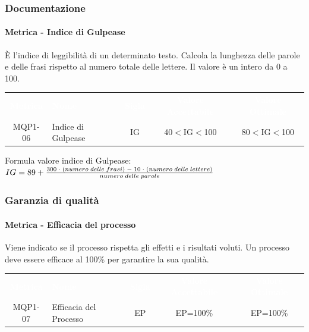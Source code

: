     \subsubsection{Documentazione}
        \paragraph{Metrica - Indice di Gulpease}
        È l'indice di leggibilità di un determinato testo. Calcola la lunghezza delle parole e delle frasi rispetto al numero totale delle lettere. Il valore è un intero da 0 a 100.

        \renewcommand{\arraystretch}{1.5}
        \begin{longtable}{ c C{4cm} c c c}
        \textcolor{white}{\textbf{Metrica}} & \textcolor{white}{\textbf{Nome}} & \textcolor{white}{\textbf{Sigla}} & \textcolor{white}{\textbf{Valore Accettabile}} & \textcolor{white}{\textbf{Valore Ottimale}}\\
        MQP1-06 & Indice di Gulpease & IG & 40$<$IG$<$100 & 80$<$IG$<$100 \\	     
        \end{longtable}
        Formula valore indice di Gulpease: \begin{math}{IG = 89 + {{300 \; \cdot \; (numero\; delle \; frasi) \; - \; 10 \; \cdot \; (numero \; delle \; lettere)}\over numero \; delle \; parole}}\end{math}
    
    \subsubsection{Garanzia di qualità}
        \paragraph{Metrica - Efficacia del processo}
        Viene indicato se il processo rispetta gli effetti e i risultati voluti. Un processo deve essere efficace al 100\% per garantire la sua qualità.

        \renewcommand{\arraystretch}{1.5}
        \begin{longtable}{ c C{4cm} c c c}
        \textcolor{white}{\textbf{Metrica}} & \textcolor{white}{\textbf{Nome}} & \textcolor{white}{\textbf{Sigla}} & \textcolor{white}{\textbf{Valore Accettabile}} & \textcolor{white}{\textbf{Valore Ottimale}}\\
        MQP1-07 & Efficacia del Processo & EP & EP=100\%  & EP=100\%  \\	     
        \end{longtable}

